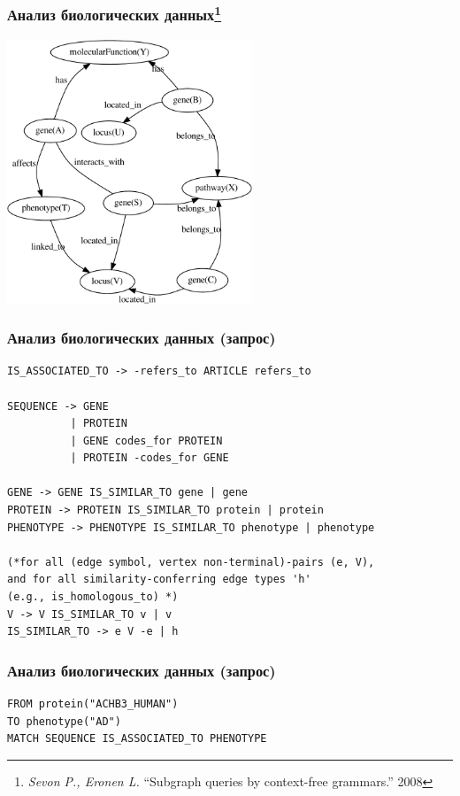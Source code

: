 \documentclass{beamer}
\begin{document}
\begin{frame}[fragile]

  \frametitle{Анализ биологических данных\footnote{\emph{Sevon P., Eronen L.} ``Subgraph queries by context-free grammars.'' 2008}}
  \includegraphics[width=0.55\textwidth]{figures/bioDB-crop.pdf}
\end{frame}

\begin{frame}[fragile]

  \frametitle{Анализ биологических данных (запрос)}
    \begin{verbatim}
IS_ASSOCIATED_TO -> -refers_to ARTICLE refers_to

SEQUENCE -> GENE
          | PROTEIN
          | GENE codes_for PROTEIN
          | PROTEIN -codes_for GENE

GENE -> GENE IS_SIMILAR_TO gene | gene
PROTEIN -> PROTEIN IS_SIMILAR_TO protein | protein
PHENOTYPE -> PHENOTYPE IS_SIMILAR_TO phenotype | phenotype

(*for all (edge symbol, vertex non-terminal)-pairs (e, V),
and for all similarity-conferring edge types 'h'
(e.g., is_homologous_to) *)
V -> V IS_SIMILAR_TO v | v
IS_SIMILAR_TO -> e V -e | h
    \end{verbatim}

\end{frame}

\begin{frame}[fragile]

  \frametitle{Анализ биологических данных (запрос)}
    \begin{verbatim}
FROM protein("ACHB3_HUMAN")
TO phenotype("AD")
MATCH SEQUENCE IS_ASSOCIATED_TO PHENOTYPE
    \end{verbatim}

\end{frame}
\end{document}
